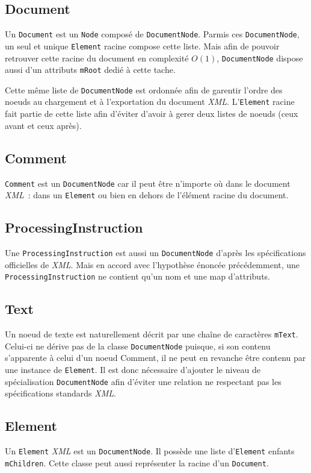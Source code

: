     \subsection{Document}
        Un \lstinline$Document$ est un \lstinline$Node$ composé de \lstinline$DocumentNode$. Parmis ces \lstinline$DocumentNode$, un seul et unique \lstinline$Element$ racine compose cette liste. Mais afin de pouvoir retrouver cette racine du document en complexité $O(1)$, \lstinline$DocumentNode$ dispose aussi d'un attributs \lstinline$mRoot$ dedié à cette tache.

        Cette même liste de \lstinline$DocumentNode$ est ordonnée afin de garentir l'ordre des noeuds au chargement et à l'exportation du document \textit{XML}. L'\lstinline$Element$ racine fait partie de cette liste afin d'éviter d'avoir à gerer deux listes de noeuds (ceux avant et ceux après).

    \subsection{Comment}
        \lstinline$Comment$ est un \lstinline$DocumentNode$ car il peut être n'importe où dans le document \textit{XML}~: dans un \lstinline$Element$ ou bien en dehors de l'élément racine du document.

    \subsection{ProcessingInstruction}
        Une \lstinline$ProcessingInstruction$ est aussi un \lstinline$DocumentNode$ d'après les spécifications officielles de \textit{XML}. Mais en accord avec l'hypothèse énoncée précédemment, une \lstinline$ProcessingInstruction$ ne contient qu'un nom et une map d'attributs.

    \subsection{Text}
        Un noeud de texte est naturellement décrit par une chaîne de caractères \lstinline$mText$. Celui-ci ne dérive pas de la classe \lstinline$DocumentNode$ puisque, si son contenu s'apparente à celui d'un noeud Comment, il ne peut en revanche être contenu par une instance de \lstinline$Element$. Il est donc nécessaire d'ajouter le niveau de spécialisation \lstinline$DocumentNode$ afin d'éviter une relation ne respectant pas les spécifications standards \textit{XML}.

    \subsection{Element}
        Un \lstinline$Element$ \textit{XML} est un \lstinline$DocumentNode$. Il possède une liste d'\lstinline$Element$ enfants \lstinline$mChildren$. Cette classe peut aussi représenter la racine d'un \lstinline$Document$.

